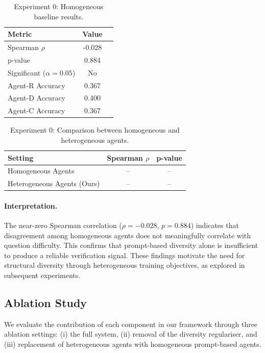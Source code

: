 \documentclass{article}
\begin{document}
\begin{table}[h]
\centering
\caption{Experiment 0: Homogeneous baseline results.}
\label{tab:exp0_homogeneous}
\begin{tabular}{lcc}
\toprule
\textbf{Metric} & \textbf{Value} \\
\midrule
Spearman $\rho$ & -0.028 \\
p-value & 0.884 \\
Significant ($\alpha=0.05$) & No \\
\midrule
Agent-R Accuracy & 0.367 \\
Agent-D Accuracy & 0.400 \\
Agent-C Accuracy & 0.367 \\
\bottomrule
\end{tabular}
\end{table}
\begin{table}[h]
\centering
\caption{Experiment 0: Comparison between homogeneous and heterogeneous agents.}
\label{tab:exp0_comparison}
\begin{tabular}{lcc}
\toprule
\textbf{Setting} & \textbf{Spearman $\rho$} & \textbf{p-value} \\
\midrule
Homogeneous Agents & -- & -- \\
Heterogeneous Agents (Ours) & -- & -- \\
\bottomrule
\end{tabular}
\end{table}
\paragraph{Interpretation.}
The near-zero Spearman correlation ($\rho = -0.028$, $p = 0.884$) indicates that disagreement among homogeneous agents does not meaningfully correlate with question difficulty. This confirms that prompt-based diversity alone is insufficient to produce a reliable verification signal. These findings motivate the need for structural diversity through heterogeneous training objectives, as explored in subsequent experiments.

\subsection{Ablation Study}

We evaluate the contribution of each component in our framework through three ablation settings: (i) the full system, (ii) removal of the diversity regulariser, and (iii) replacement of heterogeneous agents with homogeneous prompt-based agents.
\end{document}
